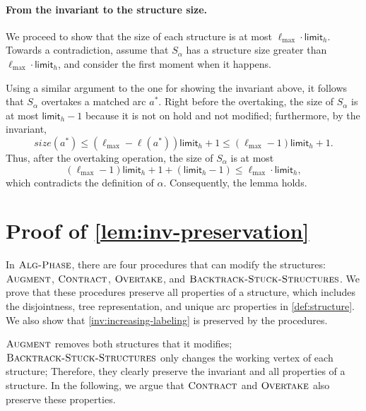\documentclass{article}
\newcommand{\alp}{\alpha}
\newcommand{\lmax}{\ell_{\max}}
\newcommand{\limit}{\mathsf{limit}}
\newcommand{\algPhase}{\textsc{Alg-Phase}\xspace}
\newcommand{\algBacktrack}{\textsc{Backtrack-Stuck-Structures}\xspace}
\newcommand{\algOvertake}{\textsc{Overtake}\xspace}
\newcommand{\algAugment}{\textsc{Augment}\xspace}
\newcommand{\algContract}{\textsc{Contract}\xspace}
\begin{document}
\paragraph{From the invariant to the structure size.}
We proceed to show that the size of each structure is at most $\lmax \cdot \limit_h$.
Towards a contradiction, assume that $S_\alp$ has a structure size greater than $\lmax \cdot \limit_h$, and consider the first moment when it happens.

Using a similar argument to the one for showing the invariant above, it follows that $S_\alp$ overtakes a matched arc $a^*$.
Right before the overtaking, the size of $S_\alp$ is at most $\limit_h - 1$ because it is not on hold and not modified;
furthermore, by the invariant,
\[
    size(a^*) \leq (\lmax - \ell(a^*))\limit_h + 1 \leq (\lmax - 1)\limit_h + 1.
\]
Thus, after the overtaking operation, the size of $S_\alp$ is at most 
\[
(\lmax - 1)\limit_h + 1 + (\limit_h - 1) \leq \lmax \cdot \limit_h,
\]
which contradicts the definition of $\alp$.
Consequently, the lemma holds.








\appendix

\section{Proof of \cref{lem:inv-preservation}} \label{sec:appendix-inv}

In $\algPhase$, there are four procedures that can modify the structures:
$\algAugment$, $\algContract$, $\algOvertake$, and $\algBacktrack$.
We prove that these procedures preserve all properties of a structure, which includes the disjointness, tree representation, and unique arc properties in \cref{def:structure}.
We also show that \cref{inv:increasing-labeling} is preserved by the procedures.

$\algAugment$ removes both structures that it modifies;
$\algBacktrack$ only changes the working vertex of each structure;
Therefore, they clearly preserve the invariant and all properties of a structure.
In the following, we argue that $\algContract$ and $\algOvertake$ also preserve these properties.
\end{document}
